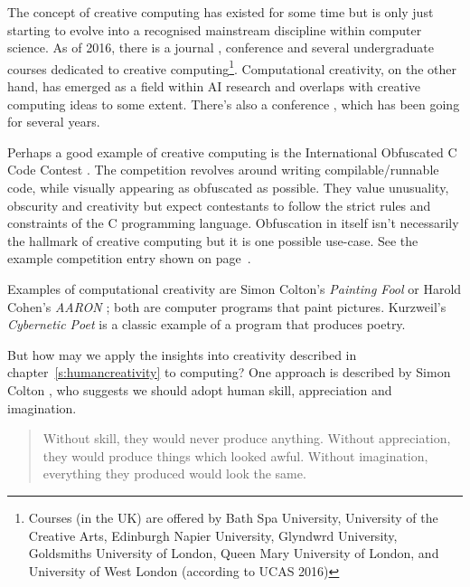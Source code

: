 The concept of creative computing has existed for some time but is only just starting to evolve into a recognised mainstream discipline within computer science. As of 2016, there is a journal \autocite{IJoCCnd}, conference \autocite{ISCC2016} and several undergraduate courses dedicated to creative computing\footnote{Courses (in the UK) are offered by Bath Spa University, University of the Creative Arts, Edinburgh Napier University, Glyndwrd University, Goldsmiths University of London, Queen Mary University of London, and University of West London (according to UCAS 2016)}. Computational creativity, on the other hand, has emerged as a field within \ac{AI} research and overlaps with creative computing ideas to some extent. There's also a conference \autocite{ICCC2017}, which has been going for several years.

Perhaps a good example of creative computing is the International Obfuscated C Code Contest \autocite{Broukhis}. The competition revolves around writing compilable/runnable code, while visually appearing as obfuscated as possible. They value unusuality, obscurity and creativity but expect contestants to follow the strict rules and constraints of the C programming language. Obfuscation in itself isn't necessarily the hallmark of creative computing but it is one possible use-case. See the example competition entry shown on page~\pageref{code:goren}.

Examples of computational creativity are Simon Colton's \textit{Painting Fool} \autocite*{Coltonnd} or Harold Cohen's \textit{AARON} \autocite{kurzweilcyberartnd}; both are computer programs that paint pictures. Kurzweil's \textit{Cybernetic Poet} \autocite{kurzweilcyberart2001} is a classic example of a program that produces poetry.

\spirals

But how may we apply the insights into creativity described in chapter~\ref{s:humancreativity} to computing? One approach is described by Simon Colton \autocite*{Colton2008}, who suggests we should adopt human skill, appreciation and imagination.

\begin{quotation}
  Without skill, they would never produce anything. Without appreciation, they would produce things which looked awful. Without imagination, everything they produced would look the same. 
\end{quotation}

